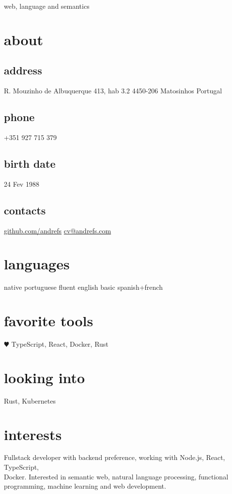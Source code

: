 \documentclass[a4paper]{friggeri-cv}
\begin{document}
       {web, language and semantics}



\begin{aside}
  \section{about}
\begin{sensitive}
    \subsection{address}
    {\small R. Mouzinho de Albuquerque 413,
    hab 3.2
    4450-206 Matosinhos
    Portugal}
    \subsection{phone}
    +351 927 715 379
    \subsection{birth date}
    24 Fev 1988
\end{sensitive}
    \subsection{contacts}
    \url{github.com/andrefs} \faGithub
    \href{mailto:cv@andrefs.com}{cv@andrefs.com} \faEnvelope
  \section{languages}
    native portuguese
    fluent english
    basic spanish+french
  \section{favorite tools}
    {$\varheartsuit$} TypeScript, React, Docker, Rust
  \section{looking into}
   {} Rust, Kubernetes
\end{aside}

\section{interests}
{Fullstack developer with backend preference, working with
Node.js, React, TypeScript,\\ Docker. Interested in semantic web, natural
language processing, functional programming, machine learning and web development.}
\end{document}
